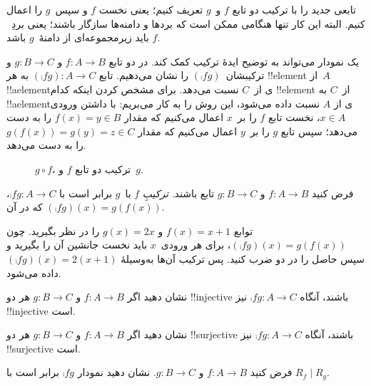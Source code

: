 \documentclass[../../../include/open-logic-section]{subfiles}
\begin{document}

\begin{explain}
 تابعی جدید را با
ترکیب دو تابع $f$ و~$g$ تعریف کنیم؛ یعنی نخست
$f$ و سپس~$g$ را اعمال کنیم. البته این کار تنها هنگامی ممکن است که
بردها و دامنه‌ها سازگار باشند؛ یعنی بردِ~$f$ باید زیرمجموعه‌ای از
دامنهٔ~$g$ باشد. 

یک نمودار می‌تواند به توضیح ایدهٔ ترکیب کمک کند. در
 دو تابع $f \colon A \to B$
و $g \colon B \to C$ و ترکیبشان~$(\comp{f}{g})$ را نشان می‌دهیم. تابع
$(\comp{f}{g}) \colon A \to C$ به هر !!{element} از~$A$
!!a{element}ی از~$C$ نسبت می‌دهد. برای مشخص کردن اینکه کدام !!{element} از~$C$
به !!a{element}ی از $A$ نسبت داده می‌شود، این روش را به کار می‌بریم: با داشتن ورودی $x \in
A$، نخست تابع $f$ را بر~$x$ اعمال می‌کنیم که مقدار $f(x)
= y \in B$ را به دست می‌دهد؛ سپس تابع $g$ را بر~$y$ اعمال می‌کنیم که مقدار
$g(f(x)) = g(y) = z \in C$ را به دست می‌دهد.
\begin{figure}
  \caption{$g \circ f$، ترکیب دو تابع $f$ و~$g$.}
\end{figure}
\end{explain}

\begin{defn}[ترکیب]
فرض کنید $f\colon A \to B$ و $g\colon B \to C$ تابع باشند.
\emph{ترکیبِ} $f$ با~$g$ برابر است با $\comp{f}{g} \colon A \to C$،
که در آن $(\comp{f}{g})(x) = g(f(x))$.
\end{defn}

\begin{ex}
توابع $f(x) = x + 1$ و $g(x) = 2x$ را در نظر بگیرید. چون
$(\comp{f}{g})(x) = g(f(x))$، برای هر ورودی~$x$ باید نخست
جانشین آن را بگیرید و سپس حاصل را در دو ضرب کنید. پس ترکیب آن‌ها
به‌وسیلهٔ $(\comp{f}{g})(x) = 2(x+1)$ داده می‌شود.
\end{ex}

\begin{prob}
نشان دهید اگر $f \colon A \to B$ و $g \colon B \to C$ هر دو
!!{injective} باشند، آنگاه $\comp{f}{g}\colon A \to C$ نیز !!{injective} است.
\end{prob}

\begin{prob}
نشان دهید اگر $f \colon A \to B$ و $g \colon B \to C$ هر دو
!!{surjective} باشند، آنگاه $\comp{f}{g}\colon A \to C$ نیز !!{surjective} است.
\end{prob}

\begin{prob}
فرض کنید $f \colon A \to B$ و $g \colon B \to C$. نشان دهید نمودار
$\comp{f}{g}$ برابر است با $R_f \mid R_g$.
\end{prob}
\end{document}
